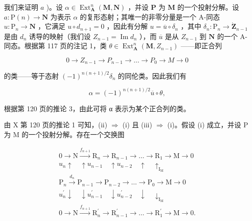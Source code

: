 我们来证明 \(a\) )。设 \(\alpha \in \operatorname{Ext}_{\mathbf{A}}^{n}(\mathbf{M}, \mathbf{N})\) ，并设 \(\mathbf{P}\) 为 \(\mathbf{M}\) 的一个投射分解。设 \(a: \mathrm{P}(n) \to \mathbf{N}\) 为表示 \(\alpha\) 的复形态射；其唯一的非零分量是一个 A-同态 \(u: \mathrm{P}_{n} \to \mathbf{N}\) ，它满足 \(u \circ d_{n+1} = 0\) ，因此有分解 \(u = \overline{u} \circ \delta_{n}\) ，其中 \(\delta_{n}: \mathrm{P}_{n} \to \dot{\mathbf{Z}}_{n-1}\) 是由 \(d_{n}\) 诱导的映射（我们设 \(Z_{n-1} = \operatorname{Im} d_{n}\) ），而 \(\overline{u}\) 是从 \(Z_{n-1}\) 到 \(\mathbf{N}\) 的一个 A-同态。根据第 117 页的注记 1，类 \(\theta \in \operatorname{Ext}_{\mathbf{A}}^{n}(\mathbf{M}, Z_{n-1})\) ——即正合列

\[
0 \rightarrow Z _ {n - 1} \rightarrow P _ {n - 1} \rightarrow \dots \rightarrow P _ {0} \rightarrow M \rightarrow 0
\]

的类——等于态射 \((-1)^{n(n + 1) / 2}\delta_n\) 的同伦类。因此我们有

\[
\alpha = (- 1) ^ {n (n + 1) / 2} \overline {{{u}}} \circ \theta ,
\]

根据第 120 页的推论 3，由此可将 α 表示为某个正合列的类。

由 X 第 120 页的推论 1 可知，(ii) \(\Rightarrow\) (i) 且 (iii) \(\Rightarrow\) (i)。假设 (i) 成立，并设 P 为 M 的一个投射分解。存在一个交换图

\[
\begin{array}{c} 0 \longrightarrow \mathrm{N} \xrightarrow {f _ {n + 1}} \mathrm{R} _ {n} \longrightarrow \mathrm{R} _ {n - 1} \longrightarrow \dots \longrightarrow \mathrm{R} _ {1} \longrightarrow \mathrm{M} \longrightarrow 0 \\ u _ {n} \uparrow \quad \uparrow u _ {n - 1} \quad \uparrow u _ {n - 2} \quad \uparrow \quad \uparrow_ {\mathrm{I} _ {\mathrm{M}}} \\ \mathrm{P} _ {n} \xrightarrow {d _ {n}} \mathrm{P} _ {n - 1} \longrightarrow \mathrm{P} _ {n - 2} \longrightarrow \dots \longrightarrow \mathrm{P} _ {0} \longrightarrow \mathrm{M} \longrightarrow 0 \\ u _ {n} ^ {\prime} \downarrow \quad \downarrow u _ {n - 1} ^ {\prime} \quad \downarrow u _ {n - 2} ^ {\prime} \quad \downarrow \quad \downarrow_ {\mathrm{I} _ {\mathrm{M}}} \\ 0 \longrightarrow \mathrm{N} \xrightarrow {f _ {n + 1}} \mathrm{R} _ {n} ^ {\prime} \longrightarrow \mathrm{R} _ {n - 1} ^ {\prime} \longrightarrow \dots \longrightarrow \mathrm{R} _ {1} ^ {\prime} \longrightarrow \mathrm{M} \longrightarrow 0. \end{array}
\]


